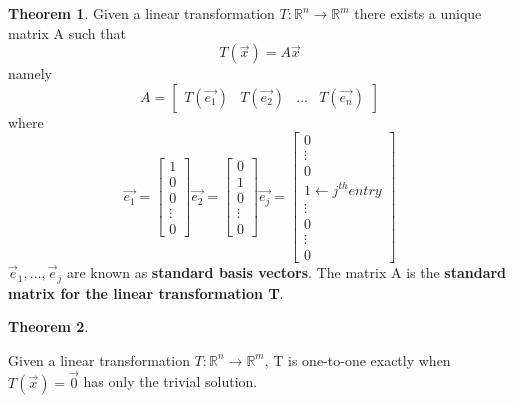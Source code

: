 \documentclass[a4paper,12pt]{article}
\theoremstyle{definition}
\newtheorem{theorem}{Theorem}
\theoremstyle{definition}
\newcommand{\mateq}[3]{#1#2 = #3}
\newcommand{\finitevecs}[2]{#1_1,\ldots,#1_#2}
\begin{document}
	\begin{theorem}
		\label{thm:lin-trans-unique-mat-thm}
		Given a linear transformation $T: \mathbb{R}^n \rightarrow \mathbb{R}^m$ there exists a unique matrix A such that
		\begin{equation*}
			T(\vec{x}) = A\vec{x}
		\end{equation*}
		namely
		\begin{equation*}
			A =
			\begin{bmatrix}
				T(\vec{e_1}) & T(\vec{e_2}) & \ldots & T(\vec{e_n})
			\end{bmatrix}
		\end{equation*}
		where
		\begin{equation*}
			\vec{e_1} =
			\begin{bmatrix}
				1\\
				0\\
				0\\
				\vdots\\
				0
			\end{bmatrix}
			\vec{e_2} =
			\begin{bmatrix}
				0\\
				1\\
				0\\
				\vdots\\
				0
			\end{bmatrix}
			\vec{e_j} =
			\begin{bmatrix}
				0\\
				\vdots\\
				0\\
				1 \leftarrow j^{th} entry\\
				\vdots\\
				0\\
				\vdots\\
				0
			\end{bmatrix}
		\end{equation*}
		$\finitevecs{\vec{e}}{j}$ are known as \textbf{standard basis vectors}. The matrix A is the \textbf{standard matrix for the linear transformation T}.
	\end{theorem}
	
	\begin{theorem}
		\label{thm:lin-trans-one-to-one-thm}
		
		Given a linear transformation $T: \mathbb{R}^n \rightarrow \mathbb{R}^m$, T is one-to-one exactly when $\mateq{T}{(\vec{x})}{\vec{0}}$ has only the trivial solution.
	\end{theorem}
	
\end{document}
